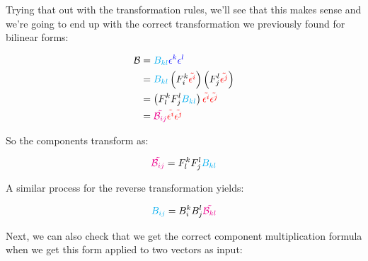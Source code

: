 Trying that out with the transformation rules, we'll see that this makes sense and we're going to end up
with the correct transformation we previously found for bilinear forms:

\begin{align*}
    \mathcal{B} &= \begingroup\color{cyan} B_{kl}\endgroup \begingroup\color{blue}\epsilon^k \epsilon^l\endgroup \\
    &= \begingroup\color{cyan} B_{kl}\endgroup \left(F^k_i \begingroup\color{red} \tilde{\epsilon^i}\endgroup\right) \left(F^l_j \begingroup\color{red} \tilde{\epsilon^j}\endgroup\right)\\
    &= \left( F^k_l F^l_j \begingroup\color{cyan} B_{kl}\endgroup \right) \begingroup\color{red} \tilde{\epsilon^i}\tilde{\epsilon^j}\endgroup\\
    &= \begingroup\color{magenta} \tilde{\mathcal{B}_{ij}} \endgroup \begingroup\color{red} \tilde{\epsilon^i}\tilde{\epsilon^j}\endgroup
\end{align*}

So the components transform as:

\begin{equation}
    \begingroup\color{magenta} \tilde{\mathcal{B}_{ij}} \endgroup =  F^k_l F^l_j \begingroup\color{cyan} B_{kl}\endgroup
\end{equation}

A similar process for the reverse transformation yields:

\begin{equation}
    \begingroup\color{cyan} B_{ij}\endgroup = B^k_i B^l_j \begingroup\color{magenta} \tilde{\mathcal{B}_{kl}} \endgroup 
\end{equation}

Next, we can also check that we get the correct component multiplication formula when we get this form applied to two vectors as input:

